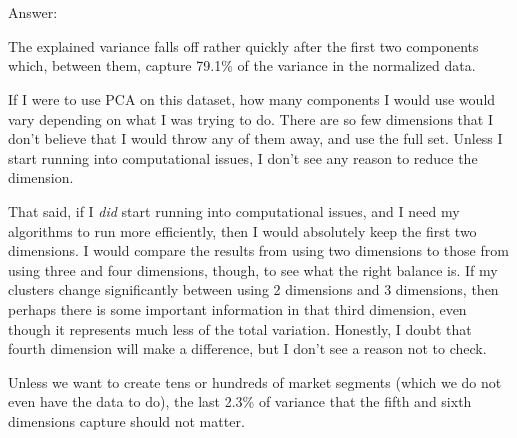 \documentclass{article}
\begin{document}
    \begin{center}
    \end{center}
    { \hspace*{\fill} \\}
    
    \begin{center}
    \end{center}
    { \hspace*{\fill} \\}
    
    Answer:

The explained variance falls off rather quickly after the first two
components which, between them, capture 79.1\% of the variance in the
normalized data.

If I were to use PCA on this dataset, how many components I would use
would vary depending on what I was trying to do. There are so few
dimensions that I don't believe that I would throw any of them away, and
use the full set. Unless I start running into computational issues, I
don't see any reason to reduce the dimension.

That said, if I \emph{did} start running into computational issues, and
I need my algorithms to run more efficiently, then I would absolutely
keep the first two dimensions. I would compare the results from using
two dimensions to those from using three and four dimensions, though, to
see what the right balance is. If my clusters change significantly
between using 2 dimensions and 3 dimensions, then perhaps there is some
important information in that third dimension, even though it represents
much less of the total variation. Honestly, I doubt that fourth
dimension will make a difference, but I don't see a reason not to check.

Unless we want to create tens or hundreds of market segments (which we
do not even have the data to do), the last 2.3\% of variance that the
fifth and sixth dimensions capture should not matter.
\end{document}

